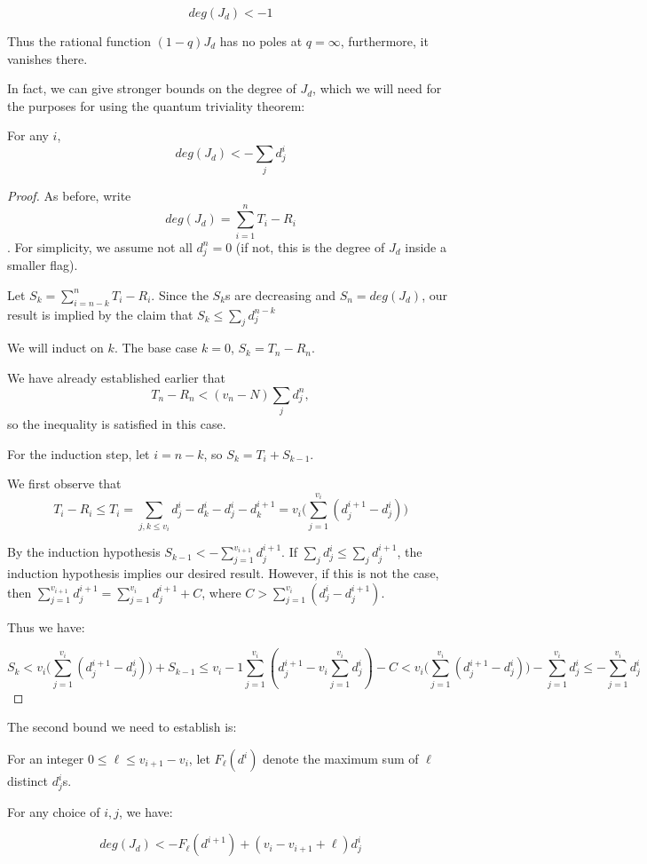 \documentclass[11pt,letterpaper]{amsart}
\begin{document}
$$deg(J_d)<-1$$

Thus the rational function $(1-q)J_d$ has no poles at $q=\infty$, furthermore, it vanishes there. 



In fact, we can give stronger bounds on the degree of $J_d$, which we will need for the purposes for using the quantum triviality theorem:

\begin{lem}
For any $i$,
$$deg(J_d)<-\sum_j d^i_{j}$$
\end{lem}

\begin{proof}
As before, write $$deg(J_d)= \sum_{i=1}^{n} T_i-R_i$$. For simplicity, we assume not all $d^n_j=0$ (if not, this is the degree of $J_d$ inside a smaller flag). 

Let $S_k=\sum_{i=n-k}^{n} T_i-R_i$. Since the $S_k$s are decreasing and $S_n=deg(J_d)$, our result is implied by the claim that $S_k\leq \sum_j d^{n-k}_j $

We will induct on $k$. The base case $k=0$, $S_k=T_n-R_n$.

We have already established earlier that
$$T_n-R_n<(v_n-N)\sum_j d^n_j,$$ so the inequality is satisfied in this case. 

For the induction step, let $i=n-k$, so $S_{k}=T_i+S_{k-1}$. 

We first observe that $$T_i-R_i\leq T_i= \sum_{j,k\leq v_{i}} d^{i}_j-d^i_k-d^i_j-d^{i+1}_k=v_i\big(\sum_{j=1}^{v_i} (d^{i+1}_j-d^i_j)\big)$$

By the induction hypothesis $S_{k-1}<-\sum_{j=1}^{v_{i+1}} d^{i+1}_j$. If $\sum_j d^{i}_j\leq\sum_j d^{i+1}_j$, the induction hypothesis implies our desired result. However, if this is not the case, then $\sum_{j=1}^{v_{i+1}} d^{i+1}_j=\sum_{j=1}^{v_{i}} d^{i+1}_j+C$, where $C>\sum_{j=1}^{v_i} (d^{i}_j-d^{i+1}_j)$. 

Thus we have:

$$S_{k}<v_i\big(\sum_{j=1}^{v_i} (d^{i+1}_j-d^i_j)\big)+S_{k-1}\leq v_i-1\sum_{j=1}^{v_i} (d^{i+1}_j-v_i\sum_{j=1}^{v_i}d^i_j)-C<v_i\big(\sum_{j=1}^{v_i} (d^{i+1}_j-d^i_j)\big)-\sum_{j=1}^{v_i}d^{i}_j\leq -\sum_{j=1}^{v_i} d^{i}_j$$



    
\end{proof}

The second bound we need to establish is:

\begin{lem}
For an integer $0\leq \ell \leq v_{i+1}-v_i$, let $F_\ell(d^{i})$ denote the maximum sum of $\ell$ distinct $d^i_j$s.

For any choice of $i,j$, we have: 

$$deg(J_d)< -F_\ell(d^{i+1})+(v_{i}-v_{i+1}+\ell)d^i_j$$
    
    


\end{lem}
\end{document}
